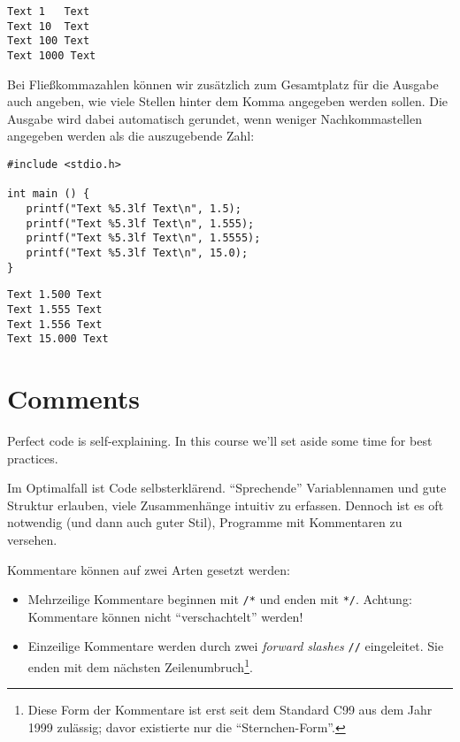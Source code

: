 \begin{cmdbox}
\begin{verbatim}
Text 1   Text
Text 10  Text
Text 100 Text
Text 1000 Text
\end{verbatim}
\end{cmdbox}

Bei Fließkommazahlen können wir zusätzlich zum Gesamtplatz für die Ausgabe auch angeben, wie viele Stellen hinter dem Komma angegeben werden sollen. Die Ausgabe wird dabei automatisch gerundet, wenn weniger Nachkommastellen angegeben werden als die auszugebende Zahl:

\begin{codebox}
\begin{verbatim}
#include <stdio.h>

int main () {
   printf("Text %5.3lf Text\n", 1.5);
   printf("Text %5.3lf Text\n", 1.555);
   printf("Text %5.3lf Text\n", 1.5555);
   printf("Text %5.3lf Text\n", 15.0);
}
\end{verbatim}
\end{codebox}

\begin{cmdbox}
\begin{verbatim}
Text 1.500 Text
Text 1.555 Text
Text 1.556 Text
Text 15.000 Text
\end{verbatim}
\end{cmdbox}


\section{Comments}
Perfect code is self-explaining. In this course we'll set aside some time for best practices. 

Im Optimalfall ist Code selbsterklärend. \enquote{Sprechende} Variablennamen und gute Struktur erlauben, viele Zusammenhänge intuitiv zu erfassen. Dennoch ist es oft notwendig (und dann auch guter Stil), Programme mit Kommentaren zu versehen.

Kommentare können auf zwei Arten gesetzt werden:
\begin{itemize}
\item Mehrzeilige Kommentare beginnen mit \texttt{/*} und enden mit \texttt{*/}. Achtung: Kommentare können nicht \enquote{verschachtelt} werden!
\item Einzeilige Kommentare werden durch zwei \emph{forward slashes} \texttt{//} eingeleitet. Sie enden mit dem nächsten Zeilenumbruch\footnote{Diese Form der Kommentare ist erst seit dem Standard C99 aus dem Jahr 1999 zulässig; davor existierte nur die \enquote{Sternchen-Form}.}.
\end{itemize}

